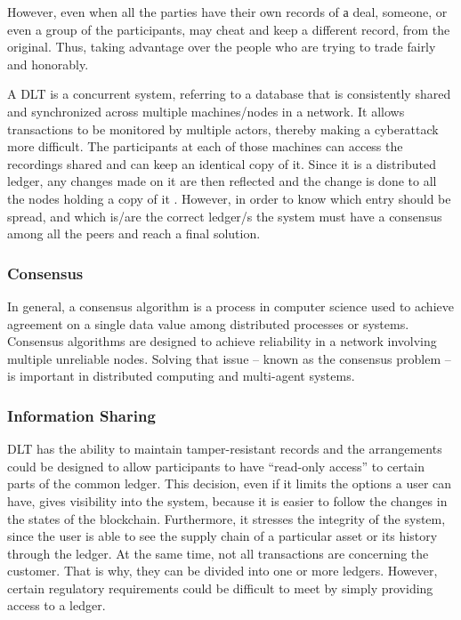 \documentclass[a4paper,11pt]{report}
\begin{document}
However, even when all the parties have their own records of а deal, someone, or even a group of the participants, may cheat and keep a different record, from the original. Thus, taking advantage over the people who are trying to trade fairly and honorably.

A DLT is a concurrent system, referring to a database that is consistently shared and synchronized across multiple machines/nodes in a network. It allows transactions to be monitored by multiple actors, thereby making a cyberattack more difficult. The participants at each of those machines can access the recordings shared and can keep an identical copy of it. Since it is a distributed ledger, any changes made on it are then reflected and the change is done to all the nodes holding a copy of it \cite{dltref} . However, in order to know which entry should be spread, and which is/are the correct ledger/s the system must have a consensus among all the peers and reach a final solution.
\subsubsection{Consensus}  
\label{consensus}

In general, a consensus algorithm is a process in computer science used to achieve agreement on a single data value among distributed processes or systems. Consensus algorithms are designed to achieve reliability in a network involving multiple unreliable nodes. Solving that issue – known as the consensus problem – is important in distributed computing and multi-agent systems.\cite{mills2016distributed}

\subsubsection{Information Sharing}  
\label{infosharing}
DLT has the ability to maintain tamper-resistant records and the arrangements could be designed to allow participants to have “read-only access” to certain parts of the common ledger. This decision, even if it limits the options a user can have, gives visibility into the system, because it is easier to follow the changes in the states of the blockchain. Furthermore, it stresses the integrity of the system, since the user is able to see the supply chain of a particular asset or its history through the ledger.
At the same time, not all transactions are concerning the customer. That is why, they can be divided into one or more ledgers. However, certain regulatory requirements could be difficult to meet by simply providing access to a ledger.\cite{mills2016distributed}
\end{document}
